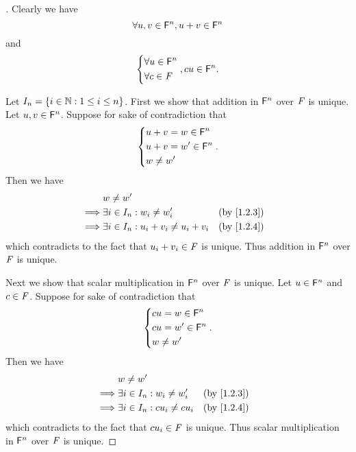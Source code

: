\begin{proof}[]
	Clearly we have
	\[
		\forall u, v \in \mathsf{F}^n, u + v \in \mathsf{F}^n
	\]
	and
	\[
		\begin{dcases}
			\forall u \in \mathsf{F}^n \\
			\forall c \in \mathit{F}
		\end{dcases}, cu \in \mathsf{F}^n.
	\]

	Let \(I_n = \left\lbrace i \in \mathbb{N} : 1 \leq i \leq n\right\rbrace\).
	First we show that addition in \(\mathsf{F}^n\) over \(\mathit{F}\) is unique.
	Let \(u, v \in \mathsf{F}^n\).
	Suppose for sake of contradiction that
	\[
		\begin{dcases}
			u + v = w \in \mathsf{F}^n  \\
			u + v = w' \in \mathsf{F}^n \\
			w \neq w'
		\end{dcases}.
	\]
	Then we have
	\begin{align*}
		         & w \neq w'                                                                  \\
		\implies & \exists i \in I_n : w_i \neq w_i'            &  & \text{(by \cref{1.2.3})} \\
		\implies & \exists i \in I_n : u_i + v_i \neq u_i + v_i &  & \text{(by \cref{1.2.4})}
	\end{align*}
	which contradicts to the fact that \(u_i + v_i \in \mathit{F}\) is unique.
	Thus addition in \(\mathsf{F}^n\) over \(\mathit{F}\) is unique.

	Next we show that scalar multiplication in \(\mathsf{F}^n\) over \(\mathit{F}\) is unique.
	Let \(u \in \mathsf{F}^n\) and \(c \in \mathit{F}\).
	Suppose for sake of contradiction that
	\[
		\begin{dcases}
			cu = w \in \mathsf{F}^n  \\
			cu = w' \in \mathsf{F}^n \\
			w \neq w'
		\end{dcases}.
	\]
	Then we have
	\begin{align*}
		         & w \neq w'                                                          \\
		\implies & \exists i \in I_n : w_i \neq w_i'    &  & \text{(by \cref{1.2.3})} \\
		\implies & \exists i \in I_n : c u_i \neq c u_i &  & \text{(by \cref{1.2.4})}
	\end{align*}
	which contradicts to the fact that \(c u_i \in \mathit{F}\) is unique.
	Thus scalar multiplication in \(\mathsf{F}^n\) over \(\mathit{F}\) is unique.


\end{proof}
